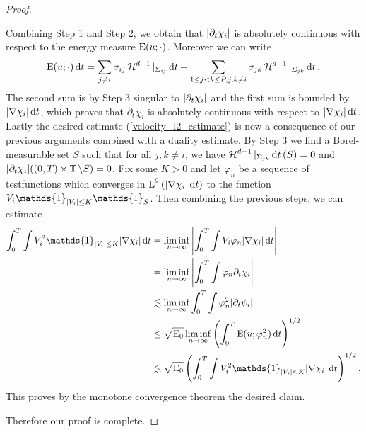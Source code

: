 \begin{proof}
\begin{description}[wide=0pt]
		Combining Step 1 and Step 2, we obtain that $ \abs{ \partial_{ t } 
		\chi_{ i } } $ is absolutely continuous with respect to the energy 
		measure $ \operatorname{E} ( u ; \cdot ) $. Moreover we can write
		\begin{equation*}
			\operatorname{E} ( u ; \cdot ) \dd{ t }
			=
			\sum_{ j \neq i }
			\sigma_{ i j }
			\operatorname{\mathcal{H}}^{ d - 1 } |_{ \Sigma_{ i j } }
			\dd{ t }
			+
			\sum_{ 1 \leq j < k \leq P , j, k \neq i }
			\sigma_{ j k }
			\operatorname{\mathcal{H}}^{ d- 1 } |_{ \Sigma_{ j k } }
			\dd{ t }.
		\end{equation*}
		The second sum is by Step 3 singular to $ \abs{ 
		\partial_{ t } \chi_{ i } } $ and the first sum is bounded by $ 
		\abs{ \nabla \chi_{ i } } \dd{ t } $, which proves that $ \partial_{ t 
		} \chi_{ i } $ is absolutely continuous with respect to $ \abs{ \nabla 
		\chi_{ i } } \dd{ t } $.
		Lastly the desired estimate (\ref{velocity_l2_estimate}) is now a 
		consequence of our 
		previous arguments combined with a duality estimate. By Step 3 we find 
		a Borel-measurable set $ S $ such that for all $ j, k \neq i $, we have 
		$ \operatorname{\mathcal{H}}^{ d-  1 } |_{ \Sigma_{ j k } } \dd{ t } ( S ) = 0 $ and $ \abs{ 
		\partial_{ t } \chi_{ i } } ( ( 0 , T ) \times \operatorname{\mathbb{T}} \setminus S ) 
		= 0 $. Fix some $ K > 0 $ 
		and let $ \varphi_{ n } $ be a sequence of testfunctions which 
		converges in 
		$ \operatorname{L}^{ 2 } \left( \abs{ \nabla \chi_{ i } } \dd{ t } \right) $ to the 
		function
		$ V_{ i } \mathds{ 1 }_{ \abs{ V_{ i } } \leq K } \mathds{ 1 }_{ 
		S } $. Then combining the 
		previous steps, we can estimate
		\begin{align*}
			\int_{ 0 }^{ T }
			\int
			V_{ i }^{ 2 } \mathds{ 1 }_{ \abs{ V_{ i } } \leq K }
			\abs{ \nabla \chi_{ i } }
			\dd{ t }
			& =
			\liminf_{ n \to \infty }
			\abs{
				\int_{ 0 }^{ T }
				\int
				V_{ i } \varphi_{ n } 
				\abs{ \nabla \chi_{ i } }
				\dd{ t }
			}
			\\
			& = 
			\liminf_{ n \to \infty }
			\abs{
				\int_{ 0 }^{ T }
				\int
				\varphi_{ n } \partial_{ t } \chi_{ i }
			}
			\\
			& \lesssim
			\liminf_{ n \to \infty }
			\int_{ 0 }^{ T }
			\int
			\varphi_{ n }^{ 2 }
			\abs{ \partial_{ t } \psi_{ i } }
			\\
			& \leq
			\sqrt{ \energy_{ 0 } }
			\liminf_{ n \to \infty }
			\left(
			\int_{ 0 }^{ T }
			\energy ( u ; \varphi_{ n }^{ 2 } )
			\dd{ t }
			\right)^{ 1/2 }
			\\
			& \lesssim
			\sqrt{ \energy_{ 0 } }
			\left(
			\int_{ 0 }^{ T }
			\int
			V_{ i }^{ 2 }
			\mathds{ 1 }_{ \abs{ V_{ i } } \leq K }
			\abs{ \nabla \chi_{ i } }
			\dd{ t }
			\right)^{ 1 / 2 }.
		\end{align*}
		This proves by the monotone convergence theorem the desired claim.
	\end{description} 
	Therefore our proof is complete.
\end{proof}

